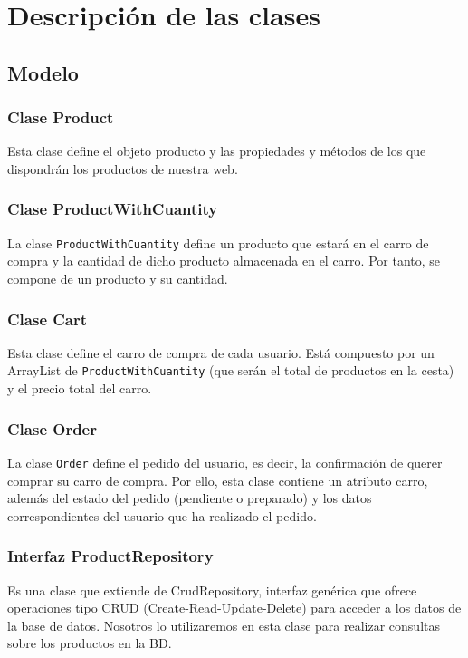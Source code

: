 \documentclass[12pt,a4paper,svgnames]{article}
\begin{document}
\clearpage

\section{Descripción de las clases}\label{sec:descripcion}
\subsection{Modelo}
\subsubsection{Clase Product}
Esta clase define el objeto producto y las propiedades y métodos de los que dispondrán los productos de nuestra web.\\
\subsubsection{Clase ProductWithCuantity}
La clase \texttt{ProductWithCuantity} define un producto que estará en el carro de compra y la cantidad de dicho producto almacenada en el carro. Por tanto, se compone de un producto y su cantidad.\\
\subsubsection{Clase Cart}
Esta clase define el carro de compra de cada usuario. Está compuesto por un ArrayList de \texttt{ProductWithCuantity} (que serán el total de productos en la cesta) y el precio total del carro.\\
\subsubsection{Clase Order}
La clase \texttt{Order} define el pedido del usuario, es decir, la confirmación de querer comprar su carro de compra. Por ello, esta clase contiene un atributo carro, además del estado del pedido (pendiente o preparado) y los datos correspondientes del usuario que ha realizado el pedido.\\
\subsubsection{Interfaz ProductRepository}
Es una clase que extiende de CrudRepository, interfaz genérica que ofrece operaciones tipo CRUD (Create-Read-Update-Delete) para acceder a los datos de la base de datos. Nosotros lo utilizaremos en esta clase para realizar consultas sobre los productos en la BD.\\
\end{document}
